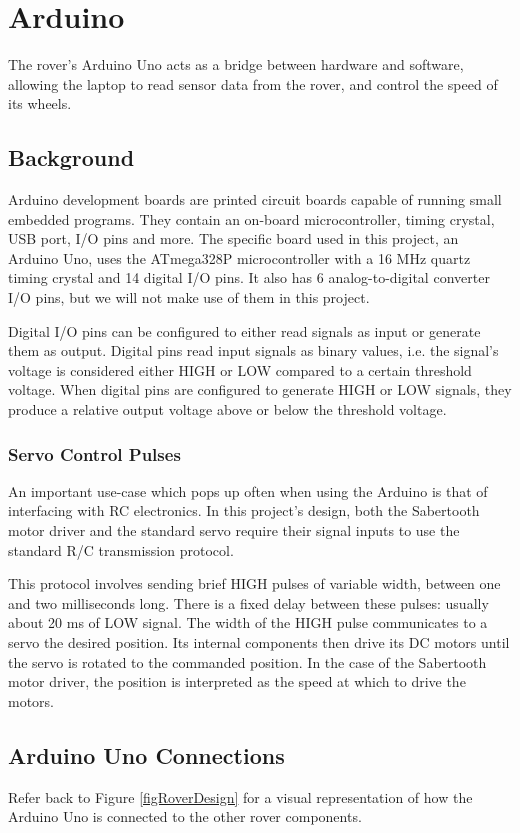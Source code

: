 \chapter{Arduino}

The rover's Arduino Uno acts as a bridge between hardware and software, allowing the laptop to read sensor data from the rover, and control the speed of its wheels.

\section{Background}
Arduino development boards are printed circuit boards capable of running small embedded programs. They contain an on-board microcontroller, timing crystal, USB port, I/O pins and more. The specific board used in this project, an Arduino Uno, uses the ATmega328P microcontroller with a 16 MHz quartz timing crystal and 14 digital I/O pins. It also has 6 analog-to-digital converter I/O pins, but we will not make use of them in this project. 

Digital I/O pins can be configured to either read signals as input or generate them as output. Digital pins read input signals as binary values, i.e. the signal's voltage is considered either HIGH or LOW compared to a certain threshold voltage. When digital pins are configured to generate HIGH or LOW signals, they produce a relative output voltage above or below the threshold voltage.

\subsection{Servo Control Pulses} \label{sectionRCPulses}
An important use-case which pops up often when using the Arduino is that of interfacing with RC electronics. In this project's design, both the Sabertooth motor driver and the standard servo require their signal inputs to use the standard R/C transmission protocol.

This protocol involves sending brief HIGH pulses of variable width, between one and two milliseconds long. There is a fixed delay between these pulses: usually about 20 ms of LOW signal. The width of the HIGH pulse communicates to a servo the desired position. Its internal components then drive its DC motors until the servo is rotated to the commanded position. In the case of the Sabertooth motor driver, the position is interpreted as the speed at which to drive the motors.

\section{Arduino Uno Connections}
Refer back to Figure \ref{figRoverDesign} for a visual representation of how the Arduino Uno is connected to the other rover components.

